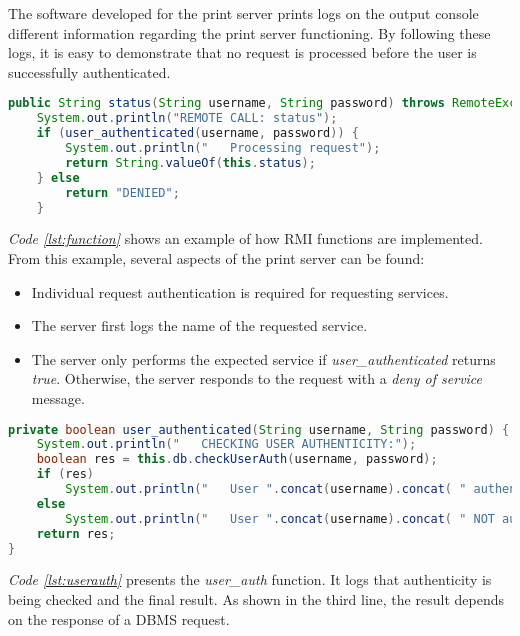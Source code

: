 The software developed for the print server prints logs on the output console different information regarding the print server functioning. By following these logs, it is easy to demonstrate that no request is processed before the user is successfully authenticated.
\begin{lstlisting}[language=Java, caption={RMI function example}, label={lst:function}, basicstyle=\scriptsize]
public String status(String username, String password) throws RemoteException{
	System.out.println("REMOTE CALL: status");
    if (user_authenticated(username, password)) {
     	System.out.println("   Processing request");
        return String.valueOf(this.status);
    } else
    	return "DENIED";
    }
\end{lstlisting}
\textit{Code \ref{lst:function}} shows an example of how RMI functions are implemented. From this example, several aspects of the print server can be found:
\begin{itemize}
	\item Individual request authentication is required for requesting services.
	\item The server first logs the name of the requested service.
	\item The server only performs the expected service if \textit{user\_authenticated} returns \textit{true}.
		Otherwise, the server responds to the request with a \textit{deny of service} message.
\end{itemize}
\begin{lstlisting}[language=Java, caption={user\_authenticated function}, label={lst:userauth}, basicstyle=\scriptsize]
private boolean user_authenticated(String username, String password) {
	System.out.println("   CHECKING USER AUTHENTICITY:");
	boolean res = this.db.checkUserAuth(username, password);
	if (res)
		System.out.println("   User ".concat(username).concat( " authenticated"));
	else
		System.out.println("   User ".concat(username).concat( " NOT authenticated"));
	return res;
}
\end{lstlisting}
\textit{Code \ref{lst:userauth}} presents the \textit{user\_auth} function. It logs that authenticity is being checked and the final result. As shown in the third line, the result depends on the response of a DBMS request.
